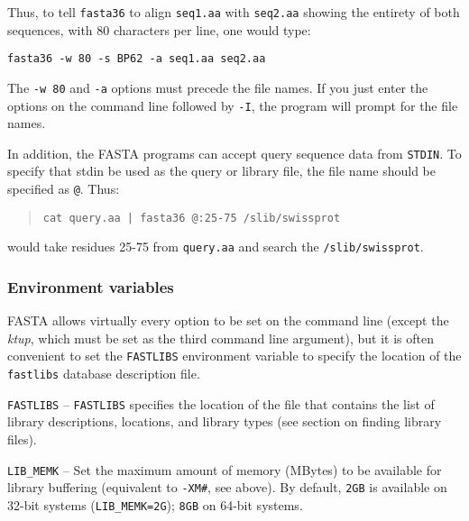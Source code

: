 \documentclass[11pt]{article}
\begin{document}
Thus, to tell \texttt{fasta36} to align \texttt{seq1.aa} with \texttt{seq2.aa} showing the entirety of both sequences, with 80 characters per line, one would type:
\begin{verbatim}
fasta36 -w 80 -s BP62 -a seq1.aa seq2.aa
\end{verbatim}
The \texttt{-w 80} and \texttt{-a} options must precede the file
names.  If you just enter the options on the command line followed by
\texttt{-I}, the program will prompt for the file names.

In addition, the FASTA programs can accept query sequence data from
\texttt{STDIN}.  To specify that stdin be used as the query or library
file, the file name should be specified as \texttt{@}.  Thus:
\begin{quote}
\texttt{cat query.aa | fasta36 @:25-75 /slib/swissprot }
\end{quote}
would take residues 25-75 from \texttt{query.aa} and search the
\texttt{/slib/swissprot}.

\subsubsection{Environment variables}

FASTA allows virtually every option to be set on the command line
(except the \emph{ktup}, which must be set as the third command line
argument), but it is often convenient to set the \texttt{FASTLIBS}
environment variable to specify the location of the \texttt{fastlibs}
database description file.

\texttt{FASTLIBS} -- \texttt{FASTLIBS}
specifies the location of the file that contains the list of library
descriptions, locations, and library types (see section on finding
library files).

\texttt{LIB\_MEMK} -- Set the maximum amount of memory (MBytes) to be
available for library buffering (equivalent to \texttt{-XM\#}, see
above).  By default, \texttt{2GB} is available on 32-bit systems
(\texttt{LIB\_MEMK=2G}); \texttt{8GB} on 64-bit systems.
\end{document}
